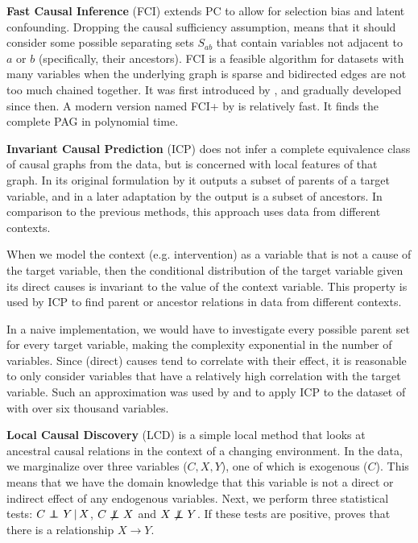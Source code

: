 \textbf{Fast Causal Inference} (FCI) extends PC to allow for selection bias and latent confounding. Dropping the causal sufficiency assumption, means that it should consider some possible separating sets $S_{ab}$ that contain variables not adjacent to $a$ or $b$ (specifically, their ancestors). FCI is a feasible algorithm for datasets with many variables when the underlying graph is sparse and bidirected edges are not too much chained together. It was first introduced by \citet{spirtes1999algorithm}, and gradually developed since then. A modern version named FCI+ by \citet{claassen2013learning} is relatively fast. It finds the complete PAG in polynomial time.
            
\textbf{Invariant Causal Prediction} (ICP) does not infer a complete equivalence class of causal graphs from the data, but is concerned with local features of that graph. In its original formulation by \citet{peters2016causal} it outputs a subset of parents of a target variable, and in a later adaptation by \citet{mooij2016joint} the output is a subset of ancestors. In comparison to the previous methods, this approach uses data from different contexts.

When we model the context (e.g. intervention) as a variable that is not a cause of the target variable, then the conditional distribution of the target variable given its direct causes is invariant to the value of the context variable. This property is used by ICP to find parent or ancestor relations in data from different contexts. 

In a naive implementation, we would have to investigate every possible parent set for every target variable, making the complexity exponential in the number of variables. Since (direct) causes tend to correlate with their effect, it is reasonable to only consider variables that have a relatively high correlation with the target variable. Such an approximation was used by \citet{peters2016causal} and \citet{meinshausen2016methods} to apply ICP to the dataset of \citet{kemmeren2014large} with over six thousand variables.

\textbf{Local Causal Discovery} (LCD) is a simple local method that looks at ancestral causal relations in the context of a changing environment. In the data, we marginalize over three variables ($C, X, Y$), one of which is exogenous ($C$). This means that we have the domain knowledge that this variable is not a direct or indirect effect of any endogenous variables. Next, we perform three statistical tests: ${C} \operatorname*{{\,\perp\mkern-12mu\perp\,}}_{} {Y} \,|\, {X}$, $C \operatorname*{{\,\not\mkern-1mu\perp\mkern-12mu\perp\,}} X$ and $X \operatorname*{{\,\not\mkern-1mu\perp\mkern-12mu\perp\,}} Y$. If these tests are positive, \citep{cooper1997simple} proves that there is a relationship $X \to Y$. 

